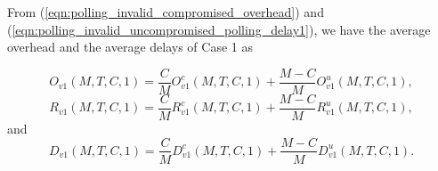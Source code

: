 \documentclass[12pt, onecolumn, draftcls]{IEEEtran}
\begin{document}
From (\ref{eqn:polling_invalid_compromised_overhead}) and
(\ref{eqn:polling_invalid_uncompromised_polling_delay1}), we have
the average overhead and the average delays of Case 1 as

\begin{equation}
O_{v1}(M,T,C,1) = \frac{C}{M} O_{v1}^c(M,T,C,1) + \frac{M-C}{M}
O_{v1}^u(M,T,C,1), \label{eqn:polling_invalid_overhead}
\end{equation}
\begin{equation}
R_{v1}(M,T,C,1) = \frac{C}{M} R_{v1}^c(M,T,C,1) + \frac{M-C}{M}
R_{v1}^u(M,T,C,1), \label{eqn:polling_invalid_round_delay1}
\end{equation}
and
\begin{equation}
D_{v1}(M,T,C,1) = \frac{C}{M} D_{v1}^c(M,T,C,1) + \frac{M-C}{M}
D_{v1}^u(M,T,C,1). \label{eqn:polling_invalid_polling_delay1}
\end{equation}
\end{document}
